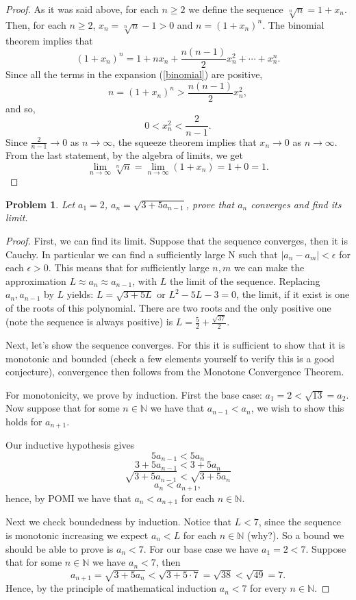 \documentclass[11pt]{article}
\theoremstyle{plain}
\newtheorem{problem}{Problem}
\theoremstyle{remark}
\begin{document}
	
	\begin{proof}
		As it was said above, for each $n \geq 2$ we define the sequence 
		$\sqrt[n]{n} = 1+x_n$. Then, for each $n \geq 2$, 
		$x_n = \sqrt[n]{n} -1 > 0$ and
		$n = (1+x_n)^n$.
		The binomial theorem implies that  
		\begin{equation}
		\label{binomial}
		(1+x_n)^n = 1 + nx_n + \frac{n(n-1)}{2}x_n^2 + \cdots + x_n^n.
		\end{equation}
		Since all the terms in the expansion (\ref{binomial}) are positive, 
		$$
		n = (1+x_n)^n > \frac{n(n-1)}{2}x_n^2,
		$$ 
		and so,  
		$$
		0< x_n^2 < \frac{2}{n-1}.
		$$
		Since $\frac{2}{n-1} \to 0$ as $n \to \infty$, the squeeze theorem implies that $x_n \to 0$ as $n \to \infty$. From the last statement, by the algebra of limits, we get
		$$
		\displaystyle{\lim_{n \to \infty}} \sqrt[n]{n} = 
		\displaystyle{\lim_{n \to \infty}} (1+x_n) = 1+0=1.
		$$
	\end{proof}

	\begin{problem}
		Let $a_1=2$, $a_n=\sqrt{3+5a_{n-1}}$, prove that $a_n$ converges and find its limit.
	\end{problem}

	\begin{proof}
		
		First, we can find its limit. Suppose that the sequence converges, then it is Cauchy. In particular we can find a sufficiently large N such that $|a_{n}-a_m|<\epsilon$ for each $\epsilon>0.$ This means that for sufficiently large $n,m$ we can make the approximation $L\approx a_n \approx a_{n-1}$, with $L$ the limit of the sequence. Replacing $a_n, a_{n-1}$ by $L$ yields: $L=\sqrt{3+5L}$ or $L^2-5L-3=0$, the limit, if it exist is one of the roots of this polynomial. There are two roots and the only positive one (note the sequence is always positive) is $L=\frac{5}{2}+\frac{\sqrt {37}}{2}$.
		
		Next, let's show the sequence converges. For this it is sufficient to show that it is monotonic and bounded (check a few elements yourself to verify this is a good conjecture), convergence then follows from the Monotone Convergence Theorem. 
		
		For monotonicity, we prove by induction. First the base case: $a_1=2<\sqrt{13}=a_2$. Now suppose that for some $n \in \mathbb N$ we have that $a_{n-1}<a_n$, we wish to show this holds for $a_{n+1}$.
		
		Our inductive hypothesis gives \[5a_{n-1}<5 a_n\]\[3+5a_{n-1}<3+5 a_n\]\[\sqrt{3+5a_{n-1}}<\sqrt{3+5 a_n}\]\[a_n<a_{n+1},\] hence, by POMI we have that $a_{n}<a_{n+1}$ for each $n\in \mathbb N$.
 		
		Next we check boundedness by induction. Notice that $L<7$, since the sequence is monotonic increasing we expect $a_n<L$ for each $n\in \mathbb N$ (why?). So a bound we should be able to prove is $a_n<7$. For our base case we have $a_1=2<7$. Suppose that for some $n\in \mathbb N$ we have $a_n<7$, then \[a_{n+1}=\sqrt{3+5a_{n}}<\sqrt{3+5\cdot7}=\sqrt{38}<\sqrt{49}=7.\] Hence,  by the principle of mathematical induction $a_n<7$ for every $n\in \mathbb N.$
	\end{proof}
	
\end{document}
